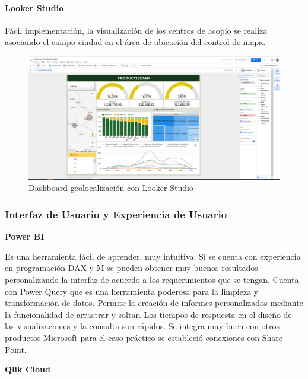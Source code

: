 \documentclass[
  11pt,
  bookmarksnumbered]{article}
\begin{document}
\hypertarget{looker-studio-1}{%
\paragraph{Looker Studio}\label{looker-studio-1}}

Fácil implementación, la visualización de los centros de acopio se realiza asociando el campo ciudad en el área de ubicación del control de mapa.

\begin{figure}

{\centering \includegraphics[width=4.76in]{media 2/image21} 

}

\caption{Dashboard geolocalización con Looker Studio}\label{fig:unnamed-chunk-26}
\end{figure}

\hypertarget{interfaz-de-usuario-y-experiencia-de-usuario}{%
\subsubsection{Interfaz de Usuario y Experiencia de Usuario}\label{interfaz-de-usuario-y-experiencia-de-usuario}}

\textbf{Power BI}

Es una herramienta fácil de aprender, muy intuitiva. Si se cuenta con experiencia en programación DAX y M se pueden obtener muy buenos resultados personalizando la interfaz de acuerdo a los requerimientos que se tengan.
Cuenta con Power Query que es una herramienta poderosa para la limpieza y transformación de datos.
Permite la creación de informes personalizados mediante la funcionalidad de arrastrar y soltar.
Los tiempos de respuesta en el diseño de las visualizaciones y la consulta son rápidos.
Se integra muy buen con otros productos Microsoft para el caso práctico se estableció conexiones con Share Point.

\textbf{Qlik Cloud}
\end{document}
